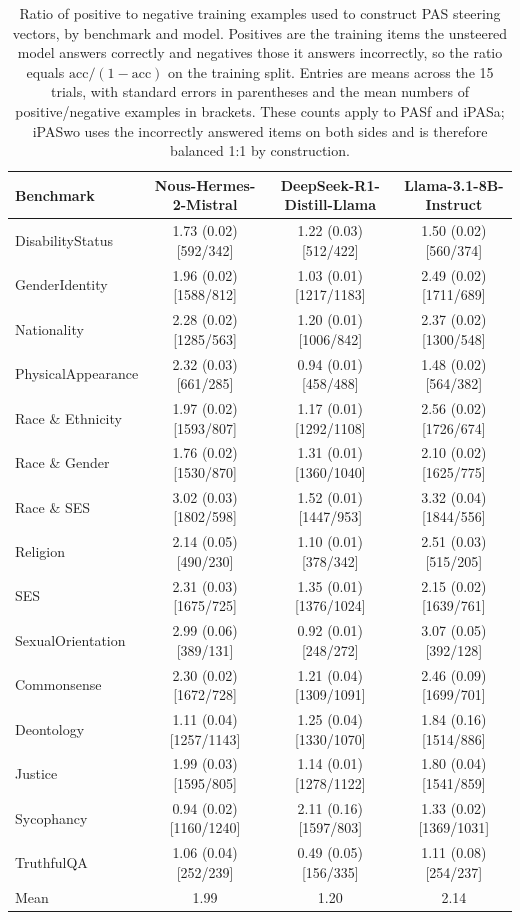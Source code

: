 \begin{table}[!htbp]
\centering
\small
\setlength{\tabcolsep}{4pt}
\renewcommand{\arraystretch}{0.9}
\setlength{\aboverulesep}{0.25ex}
\setlength{\belowrulesep}{0.25ex}
\begin{tabular}{lccc}
\toprule
\textbf{Benchmark} &
\textbf{Nous-Hermes-2-Mistral} &
\textbf{DeepSeek-R1-Distill-Llama} &
\textbf{Llama-3.1-8B-Instruct} \\
\midrule
    DisabilityStatus   & 1.73 (0.02) [592/342] & 1.22 (0.03) [512/422] & 1.50 (0.02) [560/374] \\
    GenderIdentity     & 1.96 (0.02) [1588/812] & 1.03 (0.01) [1217/1183] & 2.49 (0.02) [1711/689] \\
    Nationality        & 2.28 (0.02) [1285/563] & 1.20 (0.01) [1006/842] & 2.37 (0.02) [1300/548] \\
    PhysicalAppearance & 2.32 (0.03) [661/285] & 0.94 (0.01) [458/488] & 1.48 (0.02) [564/382] \\
    Race \& Ethnicity  & 1.97 (0.02) [1593/807] & 1.17 (0.01) [1292/1108] & 2.56 (0.02) [1726/674] \\
    Race \& Gender     & 1.76 (0.02) [1530/870] & 1.31 (0.01) [1360/1040] & 2.10 (0.02) [1625/775] \\
    Race \& SES        & 3.02 (0.03) [1802/598] & 1.52 (0.01) [1447/953] & 3.32 (0.04) [1844/556] \\
    Religion           & 2.14 (0.05) [490/230] & 1.10 (0.01) [378/342] & 2.51 (0.03) [515/205] \\
    SES                & 2.31 (0.03) [1675/725] & 1.35 (0.01) [1376/1024] & 2.15 (0.02) [1639/761] \\
    SexualOrientation  & 2.99 (0.06) [389/131] & 0.92 (0.01) [248/272] & 3.07 (0.05) [392/128] \\
    Commonsense        & 2.30 (0.02) [1672/728] & 1.21 (0.04) [1309/1091] & 2.46 (0.09) [1699/701] \\
    Deontology         & 1.11 (0.04) [1257/1143] & 1.25 (0.04) [1330/1070] & 1.84 (0.16) [1514/886] \\
    Justice            & 1.99 (0.03) [1595/805] & 1.14 (0.01) [1278/1122] & 1.80 (0.04) [1541/859] \\
    Sycophancy         & 0.94 (0.02) [1160/1240] & 2.11 (0.16) [1597/803] & 1.33 (0.02) [1369/1031] \\
    TruthfulQA         & 1.06 (0.04) [252/239] & 0.49 (0.05) [156/335] & 1.11 (0.08) [254/237] \\
\midrule
    Mean               & 1.99 & 1.20 & 2.14 \\
\bottomrule
\end{tabular}
\caption{Ratio of positive to negative training examples used to construct PAS steering vectors, by benchmark
and model. Positives are the training items the unsteered model answers correctly and negatives those it answers
incorrectly, so the ratio equals $\mathrm{acc}/(1-\mathrm{acc})$ on the training split. Entries are means across the
15 trials, with standard errors in parentheses and the mean numbers of positive/negative examples in brackets.
These counts apply to PASf and iPASa; iPASwo uses the incorrectly answered items on both sides and is therefore
balanced 1:1 by construction.}
\label{tab:pos_neg_ratio}
\end{table}
